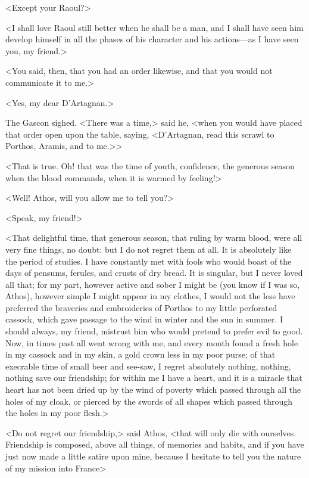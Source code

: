 <Except your Raoul?>

<I shall love Raoul still better when he shall be a man, and I shall have seen him develop himself in all the phases of his character and his actions—as I have seen you, my friend.>

<You said, then, that you had an order likewise, and that you would not communicate it to me.>

<Yes, my dear D'Artagnan.>

The Gascon sighed. <There was a time,> said he, <when you would have placed that order open upon the table, saying, <D'Artagnan, read this scrawl to Porthos, Aramis, and to me.>>

<That is true. Oh! that was the time of youth, confidence, the generous season when the blood commands, when it is warmed by feeling!>

<Well! Athos, will you allow me to tell you?>

<Speak, my friend!>

<That delightful time, that generous season, that ruling by warm blood, were all very fine things, no doubt: but I do not regret them at all. It is absolutely like the period of studies. I have constantly met with fools who would boast of the days of pensums, ferules, and crusts of dry bread. It is singular, but I never loved all that; for my part, however active and sober I might be (you know if I was so, Athos), however simple I might appear in my clothes, I would not the less have preferred the braveries and embroideries of Porthos to my little perforated cassock, which gave passage to the wind in winter and the sun in summer. I should always, my friend, mistrust him who would pretend to prefer evil to good. Now, in times past all went wrong with me, and every month found a fresh hole in my cassock and in my skin, a gold crown less in my poor purse; of that execrable time of small beer and see-saw, I regret absolutely nothing, nothing, nothing save our friendship; for within me I have a heart, and it is a miracle that heart has not been dried up by the wind of poverty which passed through all the holes of my cloak, or pierced by the swords of all shapes which passed through the holes in my poor flesh.>

<Do not regret our friendship,> said Athos, <that will only die with ourselves. Friendship is composed, above all things, of memories and habits, and if you have just now made a little satire upon mine, because I hesitate to tell you the nature of my mission into France\longdash>


